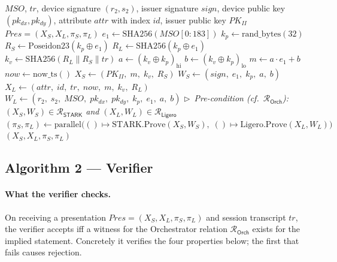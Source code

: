 \documentclass[binding=0.6cm,oneside,noexaminfo]{sapthesis}
\newcommand{\concat}{\mathbin{\|}}
\newcommand{\hipart}[1]{{#1}_{\mathrm{hi}}}
\newcommand{\lopart}[1]{{#1}_{\mathrm{lo}}}
\newcommand{\SHA}{\mathrm{SHA256}}
\newcommand{\Poseidon}{\mathrm{Poseidon23}}
\newcommand{\prand}{\mathrm{rand\_bytes}}
\newcommand{\nowts}{\mathrm{now\_ts}}
\newcommand{\STARKProve}{\mathrm{STARK.Prove}}
\newcommand{\LigeroProve}{\mathrm{Ligero.Prove}}
\newcommand{\Rel}[1]{\mathcal{R}_{#1}}
\newcommand{\RelSTARK}{\Rel{\mathsf{STARK}}}
\newcommand{\RelLigero}{\Rel{\mathsf{Ligero}}}
\newcommand{\RelOrch}{\Rel{\mathsf{Orch}}}
\begin{document}
\begin{algorithm}[H]
\caption{Orchestrator (prover for $\RelOrch$)}
\label{alg:orchestrator}
\begin{algorithmic}[1]
\Require $MSO$,\; $tr$,\; device signature $(r_2, s_2)$,\; issuer signature $sign$,\;
         device public key $(pk_{dx}, pk_{dy})$,\;
         attribute $attr$ with index $id$,\; issuer public key $PK_{II}$
\Ensure  $Pres = (X_S, X_L, \pi_S, \pi_L)$
\State $e_1 \gets \SHA(MSO[0:183])$
\State $k_p \gets \prand(32)$
\State
\State $R_S \gets \Poseidon(k_p \oplus e_1)$
\State $R_L \gets \SHA(k_p \oplus e_1)$
\State $k_v \gets \SHA(R_L \concat R_S \concat tr)$
\State
\State $a \gets \hipart{(k_v \oplus k_p)}$
\State $b \gets \lopart{(k_v \oplus k_p)}$
\State $m \gets a \cdot e_1 + b$
\State
\State $now \gets \nowts()$
\State
\State $X_S \gets (PK_{II},\; m,\; k_v,\; R_S)$
\State $W_S \gets (sign,\; e_1,\; k_p,\; a,\; b)$
\State $X_L \gets (attr,\; id,\; tr,\; now,\; m,\; k_v,\; R_L)$
\State $W_L \gets (r_2,\; s_2,\; MSO,\; pk_{dx},\; pk_{dy},\; k_p,\; e_1,\; a,\; b)$
\State
\State \(\triangleright\)~\textit{Pre-condition (cf.\ $\RelOrch$): $(X_S,W_S)\in\RelSTARK$ and
       $(X_L,W_L)\in\RelLigero$}
\State $(\pi_S, \pi_L) \gets
  \mathrm{parallel}\!\bigl(
    ()\mapsto\STARKProve(X_S,W_S),\;
    ()\mapsto\LigeroProve(X_L,W_L)
  \bigr)$
\State \Return $(X_S, X_L, \pi_S, \pi_L)$
\end{algorithmic}
\end{algorithm}

\subsection{Algorithm 2 --- Verifier}
\label{sec:verifier}

\paragraph{What the verifier checks.}
On receiving a presentation $Pres = (X_S, X_L, \pi_S, \pi_L)$ and session
transcript $tr$, the verifier accepts iff a witness for the Orchestrator
relation $\RelOrch$ exists for the implied statement. Concretely it verifies
the four properties below; the first that fails causes rejection.
\end{document}
